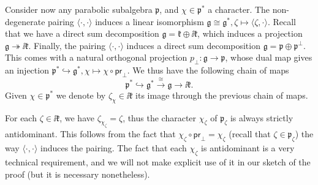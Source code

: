Consider now any parabolic subalgebra \(\mathfrak{p}\), and \(\chi\in \mathfrak{p}^*\) a character. The non-degenerate pairing \(\langle \cdot, \cdot \rangle\) induces a linear isomorphism \(\mathfrak{g}\cong \mathfrak{g}^*, \zeta \mapsto \langle \zeta, \cdot \rangle\). Recall that we have a direct sum decomposition \(\mathfrak{g}=\mathfrak{k}\oplus \ii \mathfrak{k}\), which induces a projection \(\mathfrak{g} \twoheadrightarrow \ii \mathfrak{k}\). Finally, the pairing \(\langle \cdot , \cdot \rangle\) induces a direct sum decomposition \(\mathfrak{g}=\mathfrak{p}\oplus \mathfrak{p}^\perp\). This comes with a natural orthogonal projection \(p_\perp \colon \mathfrak{g}\to \mathfrak{p}\), whose dual map gives an injection \(\mathfrak{p}^* \hookrightarrow \mathfrak{g}^*, \chi \mapsto \chi \circ \textsf{pr}_\perp \). We thus have the following chain of maps 
\[
\mathfrak{p}^* \hookrightarrow \mathfrak{g}^* \xrightarrow{\cong} \mathfrak{g} \to \ii \mathfrak{k}.
\]
Given \(\chi \in \mathfrak{p}^*\) we denote by \(\zeta_\chi\in \ii \mathfrak{k}\) its image through the previous chain of maps.


\begin{obs} \label{obs_chis_antidominant}
    For each \(\zeta\in \ii \mathfrak{k}\), we have \(\zeta_{\chi_\zeta}=\zeta\), thus the character \(\chi_\zeta\) of \(\mathfrak{p}_\zeta\) is always strictly antidominant. This follows from the fact that \(\chi_\zeta \circ \textsf{pr}_\perp=\chi_\zeta\) (recall that \(\zeta \in \mathfrak{p}_\zeta\)) the way \(\langle \cdot, \cdot \rangle\) induces the pairing. The fact that each \(\chi_\zeta\) is antidominant is a very technical requirement, and we will not make explicit use of it in our sketch of the proof (but it is necessary nonetheless).
\end{obs}


